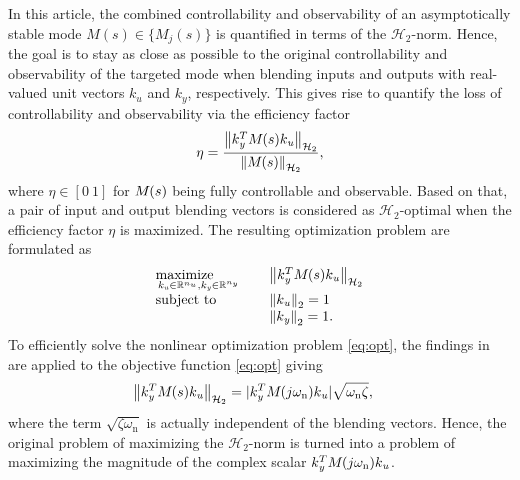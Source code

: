 \documentclass[aerospace,article,submit,moreauthors,pdftex,10pt,a4paper]{Definitions/mdpi}
\begin{document}
In this article, the combined controllability and observability of an asymptotically stable mode $M(s) \in \{ M_j (s) \}$ is quantified in terms of the $\mathcal{H}_2$-norm. 
Hence, the goal is to stay as close as possible to the original controllability and observability of the targeted mode when blending inputs and outputs with real-valued unit vectors $k_u$ and $k_y$, respectively.
This gives rise to quantify the loss of controllability and observability via the efficiency factor
%
\begin{align}
\label{eq:eta}
\eta=\frac{\Hnorm{ \aevec{k}{y}^T \aemat{M}{}(s) \aevec{k}{u} }{2}}
{\Hnorm{ \aemat{M}{}(s)}{2}},
\end{align}
%
where $\eta \in [0 ~ 1]$ for $\aemat{M}{}(s)$ being fully controllable and observable. Based on that, a pair of input and output blending vectors is considered as $\mathcal{H}_2$-optimal when the efficiency factor $\eta$ is maximized. The resulting optimization problem are formulated as
%
\begin{align}
\label{eq:opt}
\begin{array}{lll}
\underset{\aevec{k}{u} \in \mathbb{R}^{n_u},\aevec{k}{y} \in \mathbb{R}^{n_y}}{\mathrm{maximize \quad \quad}}
& &
\Hnorm{ \aevec{k}{y}^T \aemat{M}{}(s) \aevec{k}{u} }{2}
\\
\text{subject to}
& &
\norm{ \aevec{k}{u} }{2} = 1
\\
& &
\norm{ \aevec{k}{y} }{2} = 1.
\end{array}
\end{align}
%
To efficiently solve the nonlinear optimization problem \eqref{eq:opt}, the findings in \cite{Pusch2018, Pusch18a} are applied to the objective function \eqref{eq:opt} giving
%
\begin{align}
\label{eq:applyH2norm}
\Hnorm{ \aevec{k}{y}^T \aemat{M}{}(s) \aevec{k}{u}  }{2}
&=
|\aevec{k}{y}^T \aemat{M}{}(j\omega_{\text{n}}) \aevec{k}{u}|
\sqrt{\omega_{\textup{n}} \zeta},
\end{align}
%
where the term $\sqrt{ \zeta \omega_{\text{n}}}$ is actually independent of the blending vectors. Hence, the original problem of maximizing the $\mathcal{H}_2$-norm is turned into a problem of maximizing the magnitude of the complex scalar $\aevec{k}{y}^T \aemat{M}{}(j\omega_{\text{n}}) \aevec{k}{u}$. 
\end{document}
